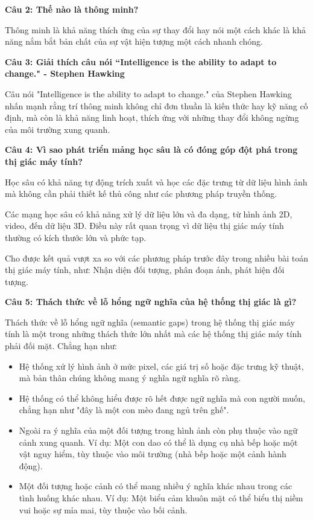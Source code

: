 \textbf{Câu 2: Thế nào là thông minh?}

Thông minh là khả năng thích ứng của sự thay đổi hay nói một cách khác là khả năng nắm bắt bản chất của sự vật hiện tượng một cách nhanh chóng.

\textbf{Câu 3: Giải thích câu nói “Intelligence is the ability to adapt to change." - Stephen Hawking}

Câu nói "Intelligence is the ability to adapt to change." của Stephen Hawking nhấn mạnh rằng trí thông minh không chỉ đơn thuần là kiến thức hay kỹ năng cố định, mà còn là khả năng linh hoạt, thích ứng với những thay đổi không ngừng của môi trường xung quanh.

\textbf{Câu 4: Vì sao phát triển mảng học sâu là có đóng góp đột phá trong thị giác máy tính?}

Học sâu có khả năng tự động trích xuất và học các đặc trưng từ dữ liệu hình ảnh mà không cần phải thiết kế thủ công như các phương pháp truyền thống.

Các mạng học sâu có khả năng xử lý dữ liệu lớn và đa dạng, từ hình ảnh 2D, video, đến dữ liệu 3D. Điều này rất quan trọng vì dữ liệu thị giác máy tính thường có kích thước lớn và phức tạp.

Cho được kết quả vượt xa so với các phương pháp trước đây trong nhiều bài toán thị giác máy tính, như: Nhận diện đối tượng, phân đoạn ảnh, phát hiện đối tượng.

\textbf{Câu 5: Thách thức về lỗ hổng ngữ nghĩa của hệ thống thị giác là gì?}

Thách thức về lỗ hổng ngữ nghĩa (semantic gaps) trong hệ thống thị giác máy tính là một trong những thách thức lớn nhất mà các hệ thống thị giác máy tính phải đối mặt. Chẳng hạn như:

\begin{itemize}
	\item Hệ thống xử lý hình ảnh ở mức pixel, các giá trị số hoặc đặc trưng kỹ thuật, mà bản thân chúng không mang ý nghĩa ngữ nghĩa rõ ràng.
	
	\item Hệ thống có thể không hiểu được rõ hết được ngữ nghĩa mà con người muốn, chẳng hạn như "đây là một con mèo đang ngủ trên ghế".
	
	\item Ngoài ra ý nghĩa của một đối tượng trong hình ảnh còn phụ thuộc vào ngữ cảnh xung quanh. Ví dụ: Một con dao có thể là dụng cụ nhà bếp hoặc một vật nguy hiểm, tùy thuộc vào môi trường (nhà bếp hoặc một cảnh hành động).
	
	\item Một đối tượng hoặc cảnh có thể mang nhiều ý nghĩa khác nhau trong các tình huống khác nhau. Ví dụ: Một biểu cảm khuôn mặt có thể biểu thị niềm vui hoặc sự mỉa mai, tùy thuộc vào bối cảnh.
\end{itemize}


